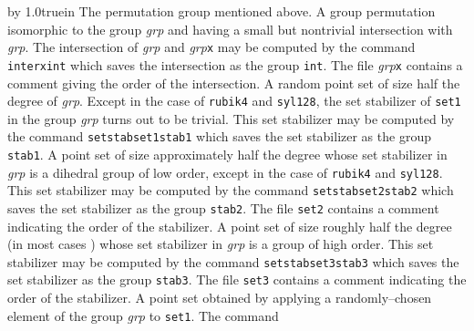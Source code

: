 {\advance\leftskip by 1.0truein\relax
   \noindent{}The permutation group mentioned above.
   \medbreak
   \noindent{}A group permutation isomorphic to the
          group {\it grp\/} and having a small but nontrivial intersection with
          {\it grp}.  The intersection of {\it grp\/} and {\it grp\/}{\tt x} may
           be computed by the command
   \smallskip
   \hskip0.4in{\tt interx\quad int}
   \smallskip
          which saves the intersection as the group {\tt int}.  The file
          {\it grp\/}{\tt x} contains a comment giving the order of the
          intersection.
   \medbreak
   \noindent{}A random point set of size half the degree
                of {\it grp}.  Except in the case of {\tt rubik4}
                and {\tt syl128}, the set stabilizer of
                 {\tt set1} in the group {\it grp\/} turns out to be trivial.  This
                 set stabilizer may be computed by the command
   \smallskip
   \hskip0.4in{\tt setstab\quad set1\quad stab1}
   \smallskip
          which saves the set stabilizer as the group {\tt stab1}.
   \medbreak
   \noindent{}A point set of size approximately
                 half the degree whose set stabilizer in {\it grp\/} 
                 is a dihedral group of low order, except in the case 
                 of {\tt rubik4} and
                 {\tt syl128}.  This set stabilizer may be computed by the command
   \smallskip
   \hskip0.4in{\tt setstab\quad set2\quad stab2}
   \smallskip
          which saves the set stabilizer as the group {\tt stab2}.
          The file {\tt set2} contains a comment indicating the order of the
          stabilizer.
   \medbreak
   \noindent{}A point set of size roughly
                 half the degree (in most cases ) whose set stabilizer in {\it grp\/} is a
                 group of high order.  This set stabilizer may be
                 computed by the command
   \smallskip
   \hskip0.4in{\tt setstab\quad set3\quad stab3}
   \smallskip
          which saves the set stabilizer as the group {\tt stab3}.
          The file {\tt set3} contains a comment indicating the order of the
          stabilizer.
   \medbreak
   \noindent{}A point set obtained by applying a
                 randomly--chosen element of the group {\it grp\/} to {\tt set1}.
                 The command
}
